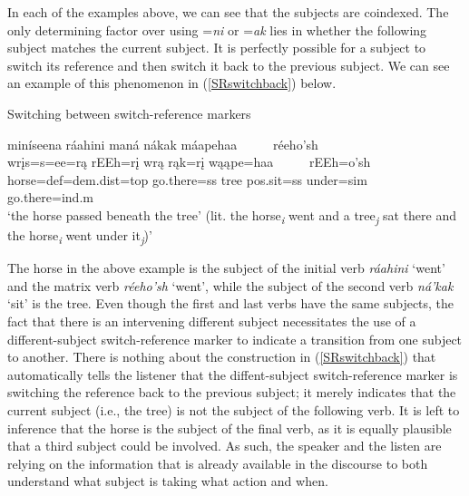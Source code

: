 In each of the examples above, we can see that the subjects are coindexed. The only determining factor over using =\textit{ni} or =\textit{ak} lies in whether the following subject matches the current subject. It is perfectly possible for a subject to switch its reference and then switch it back to the previous subject. We can see an example of this phenomenon in (\ref{SRswitchback}) below.

\begin{exe}

\item\label{SRswitchback} Switching between switch-reference markers

\glll miníseena ráahini maná nákak máapehaa ~ ~ ~ réeho'sh\\
	wrįs=s=ee=rą rEEh=rį wrą rąk=rį wąąpe=haa ~ ~ ~ rEEh=o'sh\\
	\textnormal{horse}=def=dem.dist=top \textnormal{go.there}=ss \textnormal{tree} pos.sit=ss \textnormal{under}=sim ~ ~ ~ \textnormal{go.there}=ind.m\\
	\glt `the horse passed beneath the tree' (lit. the horse\textsubscript{\textit{i}} went and a tree\textsubscript{\textit{j}} sat there and the horse\textsubscript{\textit{i}} went under it\textsubscript{\textit{j}})' \citep[226]{mixco1997b}

\end{exe}

The horse in the above example is the subject of the initial verb \textit{ráahini} `went' and the matrix verb \textit{réeho'sh} `went', while the subject of the second verb \textit{ná'kak} `sit' is the tree. Even though the first and last verbs have the same subjects, the fact that there is an intervening different subject necessitates the use of a different-subject switch-reference marker to indicate a transition from one subject to another. There is nothing about the construction in (\ref{SRswitchback}) that automatically tells the listener that the diffent-subject switch-reference marker is switching the reference back to the previous subject; it merely indicates that the current subject (i.e., the tree) is not the subject of the following verb. It is left to inference that the horse is the subject of the final verb, as it is equally plausible that a third subject could be involved. As such, the speaker and the listen are relying on the information that is already available in the discourse to both understand what subject is taking what action and when.



